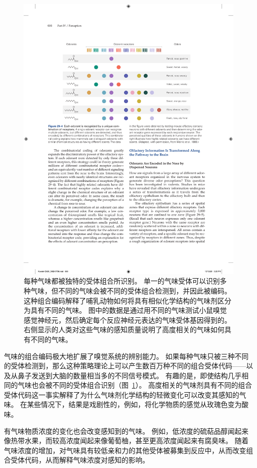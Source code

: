 \begin{figure}[htbp]
	\centering
	\includegraphics[width=0.8\linewidth]{chap29/fig_29_4}
	\caption{每种气味都被独特的受体组合所识别。
		单一的气味受体可以识别多种气味，但不同的气味会被不同的受体组合检测到，并因此被编码。
		这种组合编码解释了哺乳动物如何将具有相似化学结构的气味剂区分为具有不同的气味。
		图中的数据是通过用不同的气味测试小鼠嗅觉感觉神经元，然后确定每个反应神经元表达的气味受体基因得到的。
		右侧显示的人类对这些气味的感知质量说明了高度相关的气味如何具有不同的气味\cite{malnic1999combinatorial}。}
	\label{fig:29_4}
\end{figure}


气味的组合编码极大地扩展了嗅觉系统的辨别能力。
如果每种气味只被三种不同的受体检测到，那么这种策略理论上可以产生数百万种不同的组合受体代码——以及从鼻子发送到大脑的数量相当多的不同信号模式。
有趣的是，即使结构几乎相同的气味也会被不同的受体组合识别（图~\ref{fig:29_4}）。
高度相关的气味剂具有不同的组合受体代码这一事实解释了为什么气味剂化学结构的轻微变化可以改变其感知的气味。
在某些情况下，结果是戏剧性的，例如，将化学物质的感觉从玫瑰色变为酸味。


有气味物质浓度的变化也会改变感知到的气味。
例如，低浓度的硫萜品醇闻起来像热带水果，而较高浓度闻起来像葡萄柚，甚至更高浓度闻起来有腐臭味。
随着气味浓度的增加，对气味具有较低亲和力的其他受体被募集到反应中，从而改变组合受体代码，从而解释气味浓度对感知的影响。



